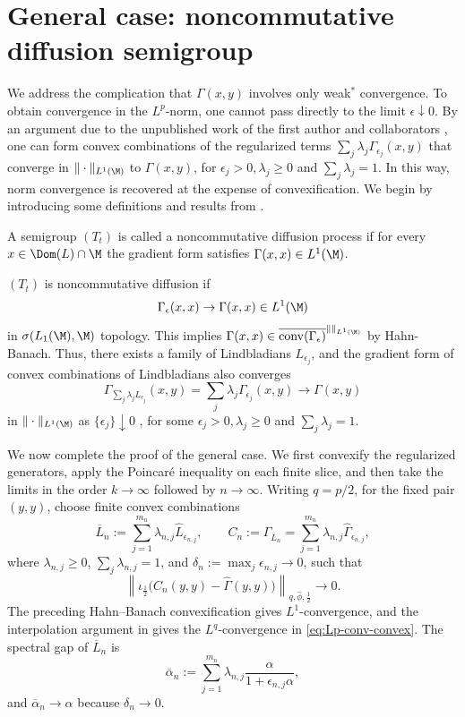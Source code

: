 \documentclass[sn-mathphys-num]{sn-jnl}
\begin{document}
\section{General case: noncommutative diffusion semigroup}\label{app:conv}
We address the complication that $\Gamma(x,y)$ involves only
weak$^*$ convergence. To obtain convergence in the $L^p$-norm, one cannot pass
directly to the limit $\epsilon\downarrow0$. By an argument due to the unpublished work of the first author and collaborators \cite{JungeRicardShlyakhtenko2025}, one can form convex combinations
of the regularized terms $\sum_j\lambda_j\Gamma_{\epsilon_j}(x,y)$ that converge in $\|\cdot\|_{L^1(\M)}$
to $\Gamma(x,y)$, for $\epsilon_j>0,\lambda_j\ge0$ and $\sum_j\lambda_j=1$. In this way, norm convergence is recovered at the expense
of convexification.
We begin by introducing some definitions and results from \cite{JungeRicardShlyakhtenko2025}.
\begin{definition}
A semigroup $(T_t)$ is called a noncommutative diffusion process if for every $x\in\Dom(L)\cap \M$ the gradient form satisfies $\Gamma(x,x)\in L^1(\M)$.
\end{definition}
\begin{proposition}
    $(T_t)$ is noncommutative diffusion if
    \begin{equation}\label{eq:gamma-l1-convergence}
        \Gamma_\epsilon(x,x)\to \Gamma(x,x)\in L^1(\M)
    \end{equation}
 in $\sigma(L_1(\M),\M)$ topology. This implies $\Gamma(x,x)\in \overline{\mathrm{conv}(\Gamma_\epsilon)}^{\|\|_{L^1(\M)}}$ by Hahn-Banach. Thus, there exists a family of Lindbladians $L_{\epsilon_j}$, and the gradient form of convex combinations of Lindbladians also converges
    \[\Gamma_{\sum_j\lambda_j L_{\epsilon_j}}(x,y)=\sum_j\lambda_j\Gamma_{\epsilon_j}(x,y)\to\Gamma(x,y)\]
in $\|\cdot\|_{L^1(\M)}$ as $\{\epsilon_j\}\downarrow0$
, for some $\epsilon_j>0,\lambda_j\ge0$ and $\sum_j\lambda_j=1$.
\end{proposition}
We now complete the proof of the general case. We first convexify the regularized
generators, apply the Poincar\'e inequality on each finite slice, and
then take the limits in the order $k\to\infty$ followed by
$n\to\infty$.
Writing $q=p/2$, for the fixed pair $(y,y)$, choose finite convex
combinations
\[
\overline L_n
:=
\sum_{j=1}^{m_n}\lambda_{n,j}\widehat L_{\epsilon_{n,j}},
\qquad
C_n
:=
\Gamma_{\overline L_n}
=
\sum_{j=1}^{m_n}\lambda_{n,j}
\widehat\Gamma_{\epsilon_{n,j}},
\]
where $\lambda_{n,j}\ge0$, $\sum_j\lambda_{n,j}=1$, and
$\delta_n:=\max_j\epsilon_{n,j}\to0$, such that
\begin{equation}\label{eq:Lp-conv-convex}
\left\|
\iota_{\frac12}\bigl(C_n(y,y)-\widehat\Gamma(y,y)\bigr)
\right\|_{q,\widehat\phi,\frac12}
\longrightarrow0.
\end{equation}
The preceding Hahn--Banach convexification gives $L^1$-convergence, and
the interpolation argument in  gives the $L^q$-convergence in \cref{eq:Lp-conv-convex}.  The spectral gap of $\overline L_n$ is
\[
\overline\alpha_n
:=
\sum_{j=1}^{m_n}\lambda_{n,j}
\frac{\alpha}{1+\epsilon_{n,j}\alpha},
\]
and $\overline\alpha_n\to\alpha$ because $\delta_n\to0$.
\end{document}
